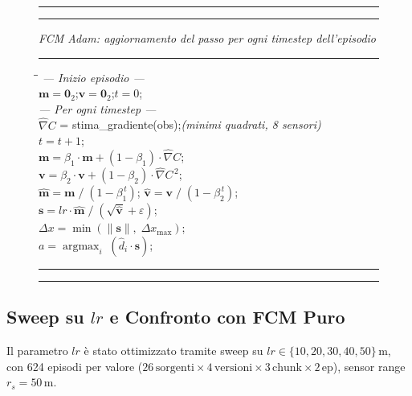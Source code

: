 \documentclass[12pt, a4paper]{article}
\begin{document}
\begin{figure}[H]
\noindent\rule{\linewidth}{0.8pt}\vspace{-3pt}
\noindent\rule{\linewidth}{0.4pt}
\vspace{4pt}

\noindent\textit{FCM Adam: aggiornamento del passo per ogni timestep dell'episodio}

\vspace{4pt}
\noindent\rule{\linewidth}{0.4pt}
\vspace{4pt}

\small
\begin{tabbing}
\hspace{2.2em}\=\hspace{2.2em}\=\kill
\textit{--- Inizio episodio ---}\\[4pt]
$\mathbf{m} = \mathbf{0}_2$;\quad $\mathbf{v} = \mathbf{0}_2$;\quad $t = 0$;\\[8pt]
\textit{--- Per ogni timestep ---}\\[4pt]
$\hat{\nabla}C$ = stima\_gradiente(obs);\quad\textit{(minimi quadrati, 8 sensori)}\\[4pt]
$t = t + 1$;\\[4pt]
$\mathbf{m} = \beta_1 \cdot \mathbf{m} + (1 - \beta_1) \cdot \hat{\nabla}C$;\\[4pt]
$\mathbf{v} = \beta_2 \cdot \mathbf{v} + (1 - \beta_2) \cdot \hat{\nabla}C^{\,2}$;\\[6pt]
$\hat{\mathbf{m}} = \mathbf{m}\;/\;(1 - \beta_1^{\,t})$;\quad
$\hat{\mathbf{v}} = \mathbf{v}\;/\;(1 - \beta_2^{\,t})$;\\[6pt]
$\mathbf{s} = lr \cdot \hat{\mathbf{m}}\;/\;(\sqrt{\hat{\mathbf{v}}} + \varepsilon)$;\\[4pt]
$\Delta x = \min(\|\mathbf{s}\|,\; \Delta x_{\max})$;\\[4pt]
$a = \operatorname{argmax}_i\;(\hat{d}_i \cdot \mathbf{s})$;
\end{tabbing}

\vspace{2pt}
\noindent\rule{\linewidth}{0.4pt}\vspace{-3pt}
\noindent\rule{\linewidth}{0.8pt}
\end{figure}

\subsection{Sweep su $lr$ e Confronto con FCM Puro}

Il parametro $lr$ \`e stato ottimizzato tramite sweep su $lr \in \{10, 20, 30, 40, 50\}\,\text{m}$,
con 624 episodi per valore ($26\,\text{sorgenti} \times 4\,\text{versioni} \times 3\,\text{chunk}
\times 2\,\text{ep}$), sensor range $r_s = 50\,\text{m}$.
\end{document}
